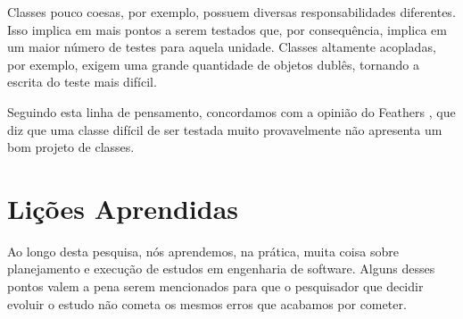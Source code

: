 Classes pouco coesas, por exemplo, possuem diversas responsabilidades diferentes.
Isso implica em mais pontos a serem testados que, por consequência, implica
em um maior número de testes para aquela unidade. Classes altamente acopladas,
por exemplo, exigem uma grande quantidade de objetos dublês, tornando a escrita
do teste mais difícil.

Seguindo esta linha de pensamento, concordamos com a opinião do Feathers \cite{feathers-synergy}, 
que diz que uma classe difícil de ser testada muito provavelmente
não apresenta um bom projeto de classes.

\section{Lições Aprendidas}

Ao longo desta pesquisa, nós aprendemos, na prática, muita coisa sobre planejamento
e execução de estudos em engenharia de software. Alguns desses pontos valem
a pena serem mencionados para que o pesquisador que decidir evoluir o estudo
não cometa os mesmos erros que acabamos por cometer. 

